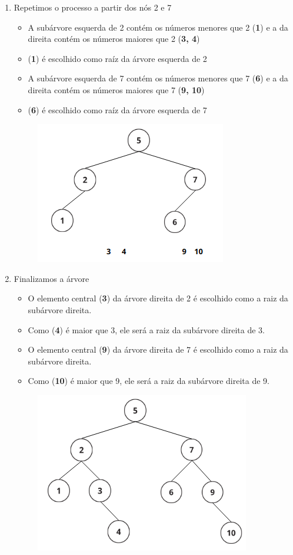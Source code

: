 \begin{enumerate}
    \item Repetimos o processo a partir dos nós 2 e 7
    \begin{itemize}
        \item A subárvore esquerda de 2 contém os números menores que 2 (\textbf{1}) e a da direita contém os números maiores que 2 (\textbf{3, 4})
        \item (\textbf{1}) é escolhido como raíz da árvore esquerda de 2
        \item A subárvore esquerda de 7 contém os números menores que 7 (\textbf{6}) e a da direita contém os números maiores que 7 (\textbf{9, 10})
        \item (\textbf{6}) é escolhido como raíz da árvore esquerda de 7
    \end{itemize}
    
    \begin{figure}[!ht]
	\centering
	\includegraphics[scale=0.7]{figures/binaria/passo3.png}
	\label{fig:bubble_sort_example}
    \end{figure}
    
    \item Finalizamos a árvore
    \begin{itemize}
        \item O elemento central (\textbf{3}) da árvore direita de 2 é escolhido como a raiz da subárvore direita.
        \item Como (\textbf{4}) é maior que 3, ele será a  raiz da subárvore direita de 3.
        \item O elemento central (\textbf{9}) da árvore direita de 7 é escolhido como a raiz da subárvore direita.
        \item Como (\textbf{10}) é maior que 9, ele será a raiz da subárvore direita de 9.
    \end{itemize}

    \begin{figure}[H]
	\centering
	\includegraphics[scale=0.7]{figures/binaria/passo4.png}
	\label{fig:bubble_sort_example}
    \end{figure}
\end{enumerate}
